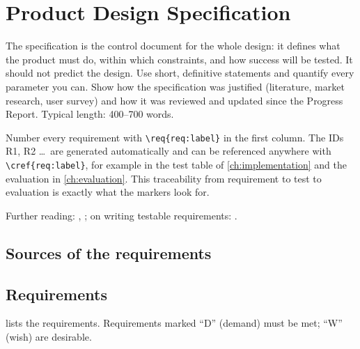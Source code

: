 \chapter{Product Design Specification}
\label{ch:specification}

\begin{guidance}
The specification is the control document for the whole design: it defines
what the product must do, within which constraints, and how success will be
tested. It should not predict the design. Use short, definitive statements
and quantify every parameter you can. Show how the specification was
justified (literature, market research, user survey) and how it was reviewed
and updated since the Progress Report. Typical length: 400--700 words.

Number every requirement with \verb|\req{req:label}| in the first column. The
IDs R1, R2 \ldots\ are generated automatically and can be referenced
anywhere with \verb|\cref{req:label}|, for example in the test table of
\cref{ch:implementation} and the evaluation in \cref{ch:evaluation}. This
traceability from requirement to test to evaluation is exactly what the
markers look for.

Further reading: \textcite{cross2008}, \textcite{ulrich2012}; on writing
testable requirements: \textcite{dick2017}.
\end{guidance}

\section{Sources of the requirements}
\label{sec:spec-sources}

\section{Requirements}
\label{sec:requirements}

 lists the requirements. Requirements marked
\enquote{D} (demand) must be met; \enquote{W} (wish) are desirable.

